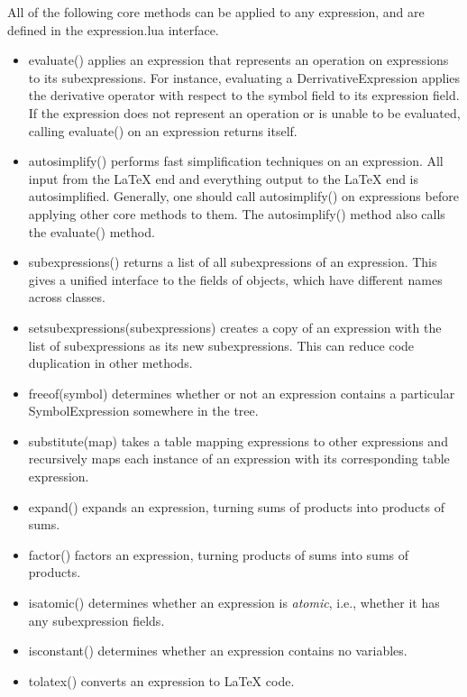 \documentclass{article}
\begin{document}
All of the following core methods can be applied to any expression, and are defined in the {\ttfamily expression.lua} interface.

\begin{itemize}
    \item {\ttfamily evaluate()} applies an expression that represents an operation on expressions to its subexpressions. For instance, evaluating a {\ttfamily DerrivativeExpression} applies the derivative operator with respect to the {\ttfamily symbol} field to its {\ttfamily expression} field. If the expression does not represent an operation or is unable to be evaluated, calling {\ttfamily evaluate()} on an expression returns itself.
    
    \item {\ttfamily autosimplify()} performs fast simplification techniques on an expression. All input from the \LaTeX{} end and everything output to the \LaTeX{} end is autosimplified. Generally, one should call {\ttfamily autosimplify()} on expressions before applying other core methods to them. The {\ttfamily autosimplify()} method also calls the {\ttfamily evaluate()} method.
    
    \item {\ttfamily subexpressions()} returns a list of all subexpressions of an expression. This gives a unified interface to the fields of objects, which have different names across classes.
    
    \item {\ttfamily setsubexpressions(subexpressions)} creates a copy of an expression with the list of subexpressions as its new subexpressions. This can reduce code duplication in other methods.
    
    \item {\ttfamily freeof(symbol)} determines whether or not an expression contains a particular \\ {\ttfamily SymbolExpression} somewhere in the tree.
    
    \item {\ttfamily substitute(map)} takes a table mapping expressions to other expressions and recursively maps each instance of an expression with its corresponding table expression.
    
    \item {\ttfamily expand()} expands an expression, turning sums of products into products of sums.
    
    \item {\ttfamily factor()} factors an expression, turning products of sums into sums of products.
    
    \item {\ttfamily isatomic()} determines whether an expression is \emph{atomic}, i.e., whether it has any subexpression fields.
    
    \item {\ttfamily isconstant()} determines whether an expression contains no variables.
    
    \item {\ttfamily tolatex()} converts an expression to \LaTeX{} code.
\end{itemize}
\end{document}

